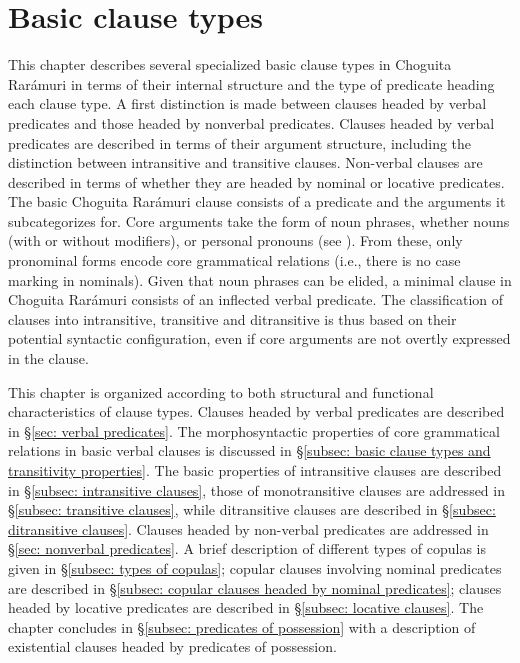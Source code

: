 \chapter{Basic clause types}
\label{chap: basic clause types}

This chapter describes several specialized basic clause types in Choguita Rarámuri in terms of their internal structure and the type of predicate heading each clause type. A first distinction is made between clauses headed by verbal predicates and those headed by nonverbal predicates. Clauses headed by verbal predicates are described in terms of their argument structure, including the distinction between intransitive and transitive clauses. Non-verbal clauses are described in terms of whether they are headed by nominal or locative predicates. The basic Choguita Rarámuri clause consists of a predicate and the arguments it subcategorizes for. Core arguments take the form of noun phrases, whether nouns (with or without modifiers), or personal pronouns  (see ). From these, only pronominal forms encode core grammatical relations (i.e., there is no case marking in nominals). Given that noun phrases can be elided, a minimal clause in Choguita Rarámuri consists of an inflected verbal predicate. The classification of clauses into intransitive, transitive and ditransitive is thus based on their potential syntactic configuration, even if core arguments are not overtly expressed in the clause.

This chapter is organized according to both structural and functional characteristics of clause types. Clauses headed by verbal predicates are described in §\ref{sec: verbal predicates}. The morphosyntactic properties of core grammatical relations in basic verbal clauses is discussed in §\ref{subsec: basic clause types and transitivity properties}. The basic properties of intransitive clauses are described in §\ref{subsec: intransitive clauses}, those of monotransitive clauses are addressed in §\ref{subsec: transitive clauses}, while ditransitive clauses are described in §\ref{subsec: ditransitive clauses}. Clauses headed by non-verbal predicates are addressed in §\ref{sec: nonverbal predicates}. A brief description of different types of copulas is given in §\ref{subsec: types of copulas}; copular clauses involving nominal predicates are described in §\ref{subsec: copular clauses headed by nominal predicates}; clauses headed by locative predicates are described in §\ref{subsec: locative clauses}. The chapter concludes in §\ref{subsec: predicates of possession} with a description of existential clauses headed by predicates of possession.

